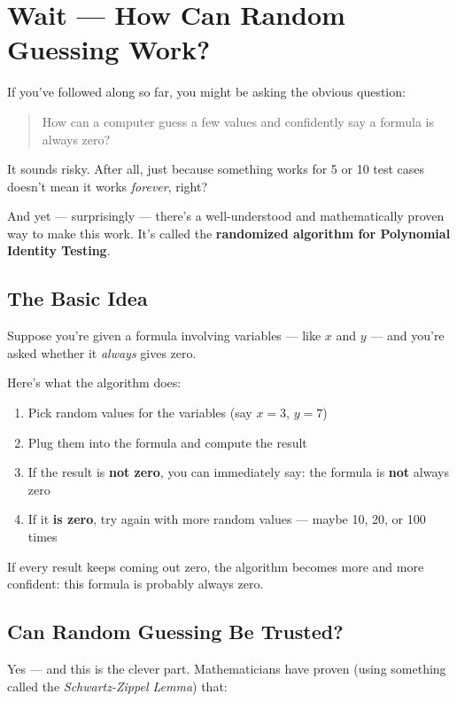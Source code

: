 
\section{Wait — How Can Random Guessing Work?}

If you’ve followed along so far, you might be asking the obvious question:

\begin{quote}
How can a computer guess a few values and confidently say a formula is always zero?
\end{quote}

It sounds risky. After all, just because something works for 5 or 10 test cases doesn’t mean it works \textit{forever}, right?

And yet — surprisingly — there’s a well-understood and mathematically proven way to make this work. It’s called the \textbf{randomized algorithm for Polynomial Identity Testing}.

\subsection*{The Basic Idea}

Suppose you’re given a formula involving variables — like $x$ and $y$ — and you're asked whether it \textit{always} gives zero.

Here’s what the algorithm does:

\begin{enumerate}
  \item Pick random values for the variables (say $x = 3$, $y = 7$)
  \item Plug them into the formula and compute the result
  \item If the result is \textbf{not zero}, you can immediately say: the formula is \textbf{not} always zero
  \item If it \textbf{is zero}, try again with more random values — maybe 10, 20, or 100 times
\end{enumerate}

If every result keeps coming out zero, the algorithm becomes more and more confident: this formula is probably always zero.

\subsection*{Can Random Guessing Be Trusted?}

Yes — and this is the clever part. Mathematicians have proven (using something called the \textit{Schwartz-Zippel Lemma}) that:

